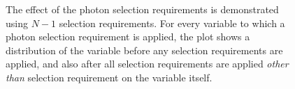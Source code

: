 \begin{figure}[p]
 \caption{The effect of the photon selection requirements is demonstrated using $N-1$ selection requirements. For every variable to which a photon selection requirement is applied, the plot shows a distribution of the variable before any selection requirements are applied, and also after all selection requirements are applied \textit{other than} selection requirement on the variable itself.}
\label{fig:PhotonNminusOneCuts_1}
\end{figure}

\begin{figure}[p]
 \centering
{}
\subfigure[]

\end{figure}
